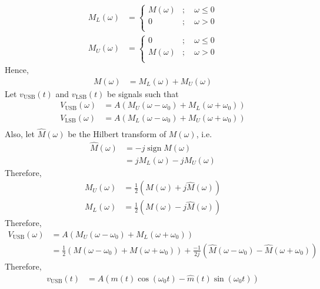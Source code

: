 \documentclass[titlepage, fleqn, a4paper, 12pt, twoside]{article}
\theoremstyle{definition}
\theoremstyle{theorem}
\renewcommand{\hat}{\widehat}
\DeclareMathOperator{\sign}{\mathrm{sign}}
\DeclareMathOperator{\USB}{\mathrm{USB}}
\DeclareMathOperator{\LSB}{\mathrm{LSB}}
\begin{document}
\begin{align*}
	M_L(\omega) &=
		\begin{cases}
			M(\omega) &;\quad \omega \le 0\\
			0 &;\quad \omega > 0\\
		\end{cases}\\
	M_U(\omega) &=
		\begin{cases}
			0 &;\quad \omega \le 0\\
			M(\omega) &;\quad \omega > 0\\
		\end{cases}
\end{align*}
Hence,
\begin{align*}
	M(\omega) &= M_L(\omega) + M_U(\omega)
\end{align*}
Let $v_{\USB}(t)$ and $v_{\LSB}(t)$ be signals such that
\begin{align*}
	V_{\USB}(\omega) &= A \left( M_U(\omega - \omega_0) + M_L(\omega + \omega_0) \right)\\
	V_{\LSB}(\omega) &= A \left( M_L(\omega - \omega_0) + M_U(\omega + \omega_0) \right)\\
\end{align*}
Also, let $\hat{M}(\omega)$ be the Hilbert transform of $M(\omega)$, i.e.
\begin{align*}
	\hat{M}(\omega) &= -j \sign M(\omega)\\
	&= j M_L(\omega) - j M_U(\omega)
\end{align*}
Therefore,
\begin{align*}
	M_U(\omega) &= \frac{1}{2} \left( M(\omega) + j \hat{M}(\omega) \right)\\
	M_L(\omega) &= \frac{1}{2} \left( M(\omega) - j \hat{M}(\omega) \right)
\end{align*}
Therefore,
\begin{align*}
	V_{\USB}(\omega) &= A \left( M_U(\omega - \omega_0) + M_L(\omega + \omega_0) \right)\\
	&= \frac{1}{2} \left( M(\omega - \omega_0) + M(\omega + \omega_0) \right) + \frac{-1}{2 j} \left( \hat{M}(\omega - \omega_0) - \hat{M}(\omega + \omega_0) \right)
\end{align*}
Therefore,
\begin{align*}
	v_{\USB}(t) &= A \left( m(t) \cos(\omega_0 t) - \hat{m}(t) \sin(\omega_0 t) \right)
\end{align*}
\end{document}
